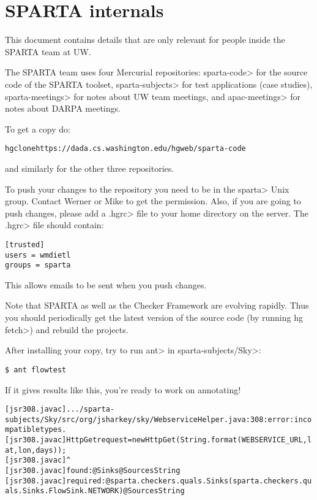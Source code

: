 \htmlhr
\chapter{SPARTA internals\label{sparta-internals}}

This document contains details that are only relevant for
people inside the SPARTA team at UW.

The SPARTA team uses four Mercurial repositories:
\<sparta-code> for the source code of the SPARTA toolset,
\<sparta-subjects> for test applications (case studies),
\<sparta-meetings> for notes about UW team meetings, and
\<apac-meetings> for notes about DARPA meetings.

To get a copy do:

\begin{alltt}
hg clone https://dada.cs.washington.edu/hgweb/sparta-code
\end{alltt}

\noindent
and similarly for the other three repositories.

To push your changes to the repository you need to be in the \<sparta> Unix
group. Contact Werner or Mike to get the permission.  Also, if you are
going to push changes, please add a \<.hgrc> file to your home directory on
the server.  The \<.hgrc> file should contain:

\begin{verbatim} 
[trusted]
users = wmdietl
groups = sparta
\end{verbatim}

This allows emails to be sent when you push changes. 

Note that SPARTA as well as the Checker Framework are evolving
rapidly.
Thus you should periodically get the latest version of the source code (by
running \<hg fetch>) and
rebuild the projects.


After installing your copy, try to run \<ant> in \<sparta-subjects/Sky>:

\begin{Verbatim}
$ ant flowtest
\end{Verbatim}

If it gives results like this, you're ready to work on annotating!

\begin{smaller}
\begin{alltt}
[jsr308.javac] .../sparta-subjects/Sky/src/org/jsharkey/sky/WebserviceHelper.java:308: error: incompatible types.
[jsr308.javac]             HttpGet request = new HttpGet(String.format(WEBSERVICE_URL, lat, lon, days));
[jsr308.javac]                                                        ^
[jsr308.javac]   found   : @Sinks @Sources String
[jsr308.javac]   required: @sparta.checkers.quals.Sinks({sparta.checkers.quals.Sinks.FlowSink.NETWORK}) @Sources String
\end{alltt}
\end{smaller}

